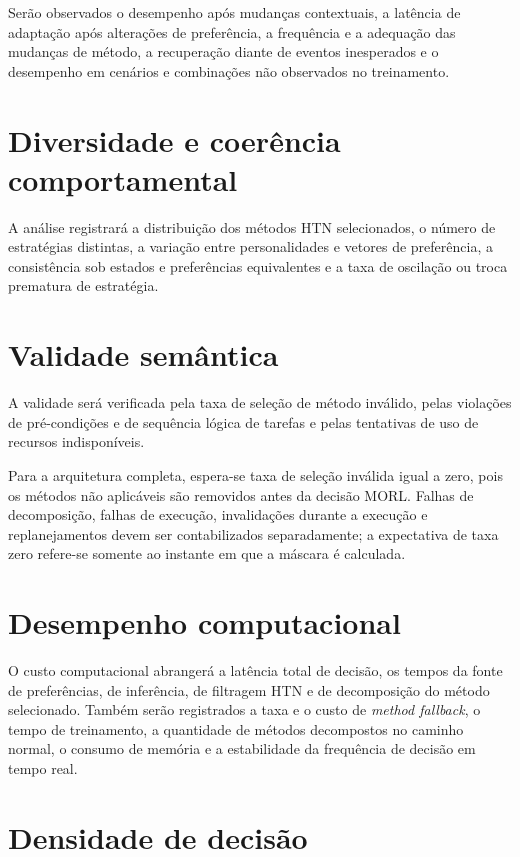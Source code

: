 Serão observados o desempenho após mudanças contextuais, a latência de
adaptação após alterações de preferência, a frequência e a adequação das
mudanças de método, a recuperação diante de eventos inesperados e o desempenho
em cenários e combinações não observados no treinamento.

\section{Diversidade e coerência comportamental}

A análise registrará a distribuição dos métodos HTN selecionados, o número de
estratégias distintas, a variação entre personalidades e vetores de preferência,
a consistência sob estados e preferências equivalentes e a taxa de oscilação ou
troca prematura de estratégia.

\section{Validade semântica}
\mbox{}\par\vspace{-0.4em}

A validade será verificada pela taxa de seleção de método inválido, pelas
violações de pré-condições e de sequência lógica de tarefas e pelas tentativas
de uso de recursos indisponíveis.

Para a arquitetura completa, espera-se taxa de seleção inválida igual a zero,
pois os métodos não aplicáveis são removidos antes da decisão MORL. Falhas de
decomposição, falhas de execução, invalidações durante a execução e
replanejamentos devem ser contabilizados separadamente; a expectativa de taxa
zero refere-se somente ao instante em que a máscara é calculada.

\section{Desempenho computacional}

O custo computacional abrangerá a latência total de decisão, os tempos da fonte
de preferências, de inferência, de filtragem HTN e de decomposição do método
selecionado. Também serão registrados a taxa e o custo de \emph{method fallback},
o tempo de treinamento, a quantidade de métodos decompostos no caminho normal,
o consumo de memória e a estabilidade da frequência de decisão em tempo real.

\section{Densidade de decisão}
\mbox{}\par\vspace{-0.4em}

